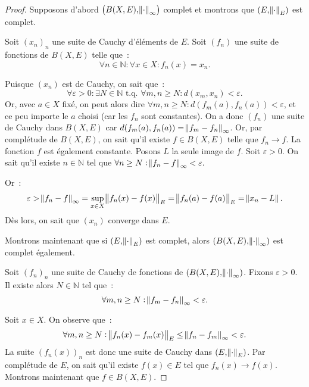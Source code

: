 \documentclass{report}
\theoremstyle{definition}
\theoremstyle{remark}
\numberwithin{equation}{section}
\newcommand{\N}{\mathbb N}
\newcommand{\tq}{\text{ t.q. }}
\begin{document}
			\begin{proof} Supposons d'abord $\left(B(X, E), \norm \cdot_\infty\right)$ complet et montrons que $(E, \norm \cdot_E)$ est complet.

			Soit $(x_n)_n$ une suite de Cauchy d'éléments de $E$. Soit $(f_n)$ une suite de fonctions de $B(X, E)$ telle que~:
			\begin{equation}
				\forall n \in \N : \forall x \in X : f_n(x) = x_n.
			\end{equation}

			Puisque $(x_n)$ est de Cauchy, on sait que~:
			\begin{equation}
				\forall \varepsilon > 0 : \exists N \in \N \tq \forall m, n \geq N : d(x_m, x_n) < \varepsilon.
			\end{equation}
			Or, avec $a \in X$ fixé, on peut alors dire $\forall m, n \geq N : d(f_m(a), f_n(a)) < \varepsilon$, et ce peu importe le $a$ choisi (car les
			$f_n$ sont constantes). On a donc $(f_n)$ une suite de Cauchy dans $B(X, E)$ car $d(f_m(a), f_n(a)) = \norm {f_m - f_n}_\infty$. Or, par
			complétude de $B(X, E)$, on sait qu'il existe $f \in B(X, E)$ telle que $f_n \to f$. La fonction $f$ est également constante. Posons $L$ la seule
			image de $f$. Soit $\varepsilon > 0$. On sait qu'il existe $n \in \N$ tel que $\forall n \geq N : \norm {f_n - f}_\infty < \varepsilon.$

			Or~:
			\begin{equation}
				\varepsilon > \norm {f_n - f}_\infty = \sup_{x \in X} \norm {f_n(x) - f(x)}_E = \norm {f_n(a) - f(a)}_E = \norm {x_n - L}.
			\end{equation}
			Dès lors, on sait que $(x_n)$ converge dans $E$.

			Montrons maintenant que si $(E, \norm \cdot_E)$ est complet, alors $(B(X, E), \norm \cdot_\infty)$ est complet également.

			Soit $(f_n)_n$ une suite de Cauchy de fonctions de $(B(X, E), \norm \cdot_\infty)$. Fixons $\varepsilon > 0$. Il existe alors $N \in \N$ tel que~:
			\begin{equation}
				\forall m, n \geq N : \norm {f_m - f_n}_\infty < \varepsilon.
			\end{equation}

			Soit $x \in X$. On observe que~:
			\begin{equation}
				\forall m, n \geq N : \norm {f_n(x) - f_m(x)}_E \leq \norm {f_n - f_m}_\infty < \varepsilon.
			\end{equation}
			La suite $(f_n(x))_n$ est donc une suite de Cauchy dans $(E, \norm \cdot_E)$. Par complétude de $E$, on sait qu'il existe $f(x) \in E$ tel que
			$f_n(x) \to f(x)$. Montrons maintenant que $f \in B(X, E)$.


\end{proof}
\end{document}
